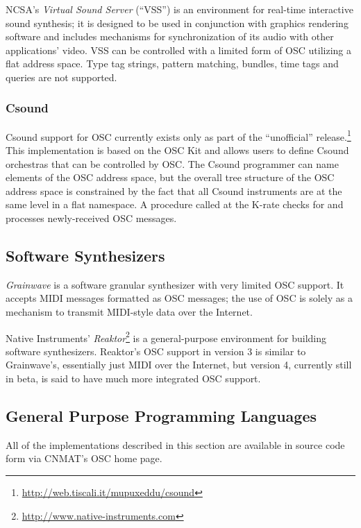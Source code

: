 NCSA's \textit{Virtual Sound Server} (``VSS'') \cite{Bargar:1994} is an environment for
real-time interactive sound synthesis; it is designed to be used in conjunction
with graphics rendering software and includes mechanisms for synchronization of
its audio with other applications' video.  VSS can be controlled with a limited
form of OSC utilizing a flat address space.  Type tag strings, pattern matching,
bundles, time tags and queries are not supported.

\subsubsection{Csound}

Csound support for OSC currently exists only as part of the ``unofficial''
release.\footnote{\url{http://web.tiscali.it/mupuxeddu/csound}}  This implementation is based
on the OSC Kit and allows users to define Csound orchestras that can be
controlled by OSC. The Csound programmer can name elements of the OSC address
space, but the overall tree structure of the OSC address space is constrained by
the fact that all Csound instruments are at the same level in a flat namespace. 
A procedure called at the K-rate checks for  and processes newly-received OSC
messages.

\subsection{Software Synthesizers}

\textit{Grainwave} \cite{Berry:2002} is a software granular synthesizer with very limited OSC
support. It accepts MIDI messages formatted as OSC messages; the use of OSC is
solely as a mechanism to transmit MIDI-style data over the Internet.

Native Instruments' \textit{Reaktor}\footnote{\url{http://www.native-instruments.com}} is a
general-purpose environment for building software synthesizers. Reaktor's OSC
support in version 3 is similar to Grainwave's, essentially just MIDI over the
Internet, but version 4, currently still in beta, is said to have much more
integrated OSC support.

\subsection{General Purpose Programming Languages}

All of the implementations described in this section are available in source code form via CNMAT's OSC home page.

